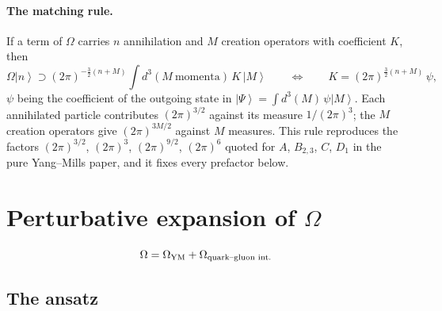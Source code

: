 \documentclass[11pt]{article}
\newcommand{\ket}[1]{\left|#1\right\rangle}
\newcommand{\OM}{\Omega}
\begin{document}
\paragraph{The matching rule.} If a term of $\OM$ carries $n$ annihilation and $M$ creation
operators with coefficient $K$, then
\begin{equation}
\OM\ket{n}\supset(2\pi)^{-\frac32(n+M)}\!\int\!d^{3}(M\ \text{momenta})\,K\,\ket{M}
\qquad\Longleftrightarrow\qquad
K=(2\pi)^{\frac32(n+M)}\,\psi ,
\label{eq:rule}
\end{equation}
$\psi$ being the coefficient of the outgoing state in $\ket{\Psi}=\int d^{3}(M)\,\psi\ket{M}$.
Each annihilated particle contributes $(2\pi)^{3/2}$ against its measure $1/(2\pi)^{3}$; the $M$
creation operators give $(2\pi)^{3M/2}$ against $M$ measures. This rule reproduces the factors
$(2\pi)^{3/2}$, $(2\pi)^{3}$, $(2\pi)^{9/2}$, $(2\pi)^{6}$ quoted for $A$, $B_{2,3}$, $C$,
$D_{1}$ in the pure Yang--Mills paper, and it fixes every prefactor below.

\section{Perturbative expansion of $\OM$}
\label{sec:Omega}

\begin{equation}
\OM=\OM_{\rm YM}+\OM_{\text{quark--gluon int.}}
\end{equation}

\subsection{The ansatz}
\end{document}
